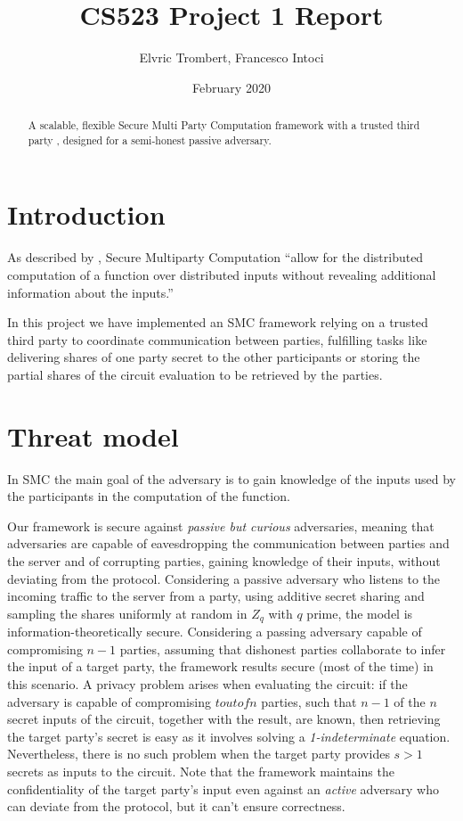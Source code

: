 \documentclass[10pt,conference,compsocconf]{IEEEtran}
\title{CS523 Project 1 Report}
\author{Elvric Trombert, Francesco Intoci}
\date{February 2020}
\begin{document}
\maketitle

\begin{abstract}
    A scalable, flexible Secure Multi Party Computation framework with a trusted third party , designed for a semi-honest passive adversary.
\end{abstract}

\section{Introduction}
As described by \cite[Frikken]{Frikken2011}, Secure Multiparty Computation \enquote{allow for the distributed computation of a
function over distributed inputs without revealing additional information about the inputs.}

In this project we have implemented an SMC framework relying on a trusted third party to coordinate communication between parties, fulfilling tasks like delivering shares of one party secret to the other participants or storing the partial shares of the circuit evaluation to be retrieved by the parties.

\section{Threat model}
In SMC the main goal of the adversary is to gain knowledge of the inputs used by the participants in the computation of
the function.

Our framework is secure against \textit{passive but curious} adversaries, meaning that adversaries are capable of eavesdropping the communication between parties and the server and of corrupting parties, gaining knowledge of their inputs, without deviating from the protocol.
Considering a passive adversary who listens to the incoming traffic to the server from a party, using additive secret sharing and sampling the shares uniformly at random in $Z_q$ with $q$ prime, the model is information-theoretically secure.
Considering a passing adversary capable of compromising $n-1$ parties, assuming that dishonest parties collaborate to infer the input of a target party, the framework results secure (most of the time) in this scenario. A privacy problem arises when evaluating the circuit: if the adversary is capable of compromising $t out of n$ parties, such that $n-1$ of the $n$ secret inputs of the circuit, together with the result, are known, then retrieving the target party's secret is easy as it involves solving a \textit{1-indeterminate} equation. Nevertheless, there is no such problem when the target party provides $s > 1$ secrets as inputs to the circuit.  
Note that the framework maintains the confidentiality of the target party's input even against an \textit{active} adversary who can deviate from the protocol, but it can't ensure correctness.
\end{document}
